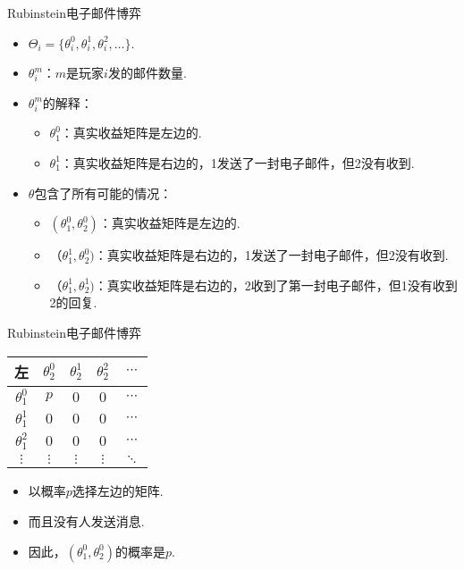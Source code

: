 {Rubinstein电子邮件博弈}
\begin{itemize}
\item $\Theta_i = \{\theta_i^0, \theta_i^1, \theta_i^2, \dots\}$.
\item $\theta_i^m$：$m$是玩家$i$发的邮件数量.
\item $\theta_i^m$的解释：
\begin{itemize}
    \item $\theta_1^0$：真实收益矩阵是左边的. 
    \item $\theta_1^1$：真实收益矩阵是右边的，1发送了一封电子邮件，但2没有收到. 
\end{itemize}
\item $\theta$包含了所有可能的情况：
\begin{itemize}
    \item $(\theta_1^0, \theta_2^0)$：真实收益矩阵是左边的. 
\item （$\theta_1^1, \theta_2^0)$：真实收益矩阵是右边的，1发送了一封电子邮件，但2没有收到. 
\item （$\theta_1^1, \theta_2^1)$：真实收益矩阵是右边的，2收到了第一封电子邮件，但1没有收到2的回复. 
\end{itemize}
\end{itemize}


{Rubinstein电子邮件博弈}
\begin{table}[ht]
    \centering
\begin{tabular}{c|cccc}
左& $\theta_2^0$ & $\theta_2^1$ & $\theta_2^2$ & $\cdots$ \\
\hline
$\theta_1^0$ & $p$ & $0$ & $0$ & $\cdots$ \\
$\theta_1^1$ & $0$ & $0$ & $0$ & $\cdots$ \\
$\theta_1^2$ & $0$ & $0$ & $0$ & $\cdots$ \\
$\vdots$ & $\vdots$ & $\vdots$ & $\vdots$ & $\ddots$
\end{tabular}
\end{table}
\begin{itemize}
\item 以概率$p$选择左边的矩阵.
\item 而且没有人发送消息.
\item 因此，$(\theta_1^0,\theta_2^0)$的概率是$p$.
\end{itemize}


